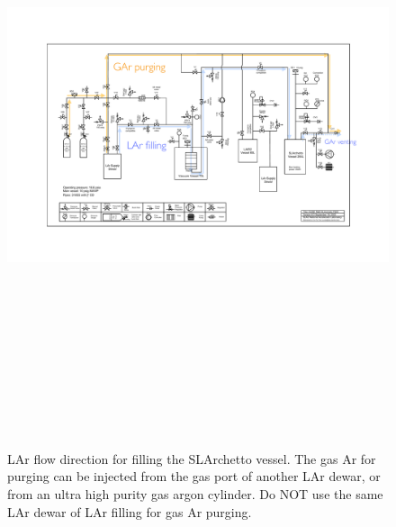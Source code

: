 \documentclass[letterpaper,11pt]{article}
\begin{document}
\begin{figure}[htb]
\begin{center}
\includegraphics[angle=90,origin=c,height=7.2in]{fig/LArFilling_PIDv8.3.pdf}
\caption{LAr flow direction for filling the SLArchetto vessel.  
The gas Ar for purging can be injected from the gas port 
of another LAr dewar, or from an ultra high purity gas argon cylinder.  
Do NOT use the same LAr dewar of LAr filling 
for gas Ar purging.}
\end{center}
\end{figure}
\end{document}
